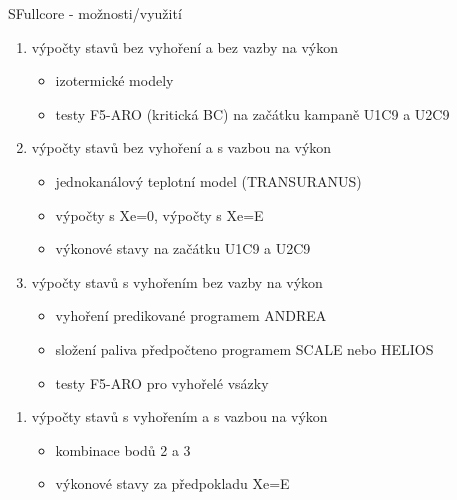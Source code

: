 \documentclass{beamer}
\begin{document}
\begin{frame}{SFullcore - možnosti/využití}

\begin{block}{}
	\begin{enumerate}\footnotesize
		\item výpočty stavů bez vyhoření a bez vazby na výkon
		\begin{itemize}\scriptsize
			\item izotermické modely
			\item testy F5-ARO (kritická BC) na začátku kampaně
U1C9 a U2C9
		\end{itemize}
		\item výpočty stavů bez vyhoření a s vazbou na výkon
		\begin{itemize}\scriptsize
			\item jednokanálový teplotní model (TRANSURANUS)
			\item výpočty s Xe=0, výpočty s Xe=E
			\item výkonové stavy na začátku U1C9 a U2C9
		\end{itemize}
		\item výpočty stavů s vyhořením bez vazby na výkon
		\begin{itemize}\scriptsize
			\item vyhoření predikované programem ANDREA
			\item složení paliva předpočteno programem SCALE nebo HELIOS
			\item testy F5-ARO pro vyhořelé vsázky
	 	\end{itemize}

	\end{enumerate}
\end{block}

\begin{exampleblock}{}
		\begin{enumerate}\footnotesize
		\setcounter{enumi}{3}
		\item výpočty stavů s vyhořením a s vazbou na výkon
			\begin{itemize}\scriptsize
				\item kombinace bodů 2 a 3
				\item výkonové stavy za předpokladu Xe=E
			\end{itemize}
	  	\end{enumerate}
\end{exampleblock}

\end{frame}
\end{document}
